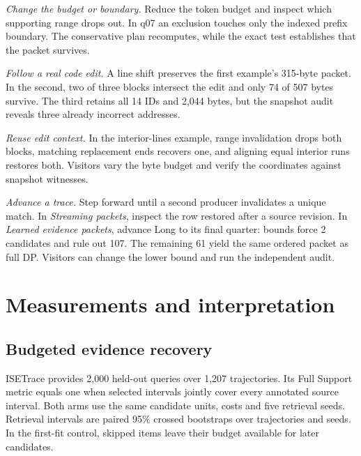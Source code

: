 \documentclass[conference]{IEEEtran}
\begin{document}
\textit{Change the budget or boundary.} Reduce the token budget and inspect which supporting range drops out. In q07 an exclusion touches only the indexed prefix boundary. The conservative plan recomputes, while the exact test establishes that the packet survives.

\textit{Follow a real code edit.} A line shift preserves the first example's 315-byte packet. In the second, two of three blocks intersect the edit and only 74 of 507 bytes survive. The third retains all 14 IDs and 2,044 bytes, but the snapshot audit reveals three already incorrect addresses. 

\textit{Reuse edit context.} In the interior-lines example, range invalidation drops both blocks, matching replacement ends recovers one, and aligning equal interior runs restores both. Visitors vary the byte budget and verify the coordinates against snapshot witnesses.

\textit{Advance a trace.} Step forward until a second producer invalidates a unique match. In \emph{Streaming packets}, inspect the row restored after a source revision. In \emph{Learned evidence packets}, advance Long to its final quarter: bounds force 2 candidates and rule out 107. The remaining 61 yield the same ordered packet as full DP. Visitors can change the lower bound and run the independent audit.

\section{Measurements and interpretation}
\subsection{Budgeted evidence recovery}
ISETrace provides 2,000 held-out queries over 1,207 trajectories. Its Full Support metric equals one when selected intervals jointly cover every annotated source interval. Both arms use the same candidate units, costs and five retrieval seeds. Retrieval intervals are paired 95\% crossed bootstraps over trajectories and seeds. In the first-fit control, skipped items leave their budget available for later candidates.
\end{document}
